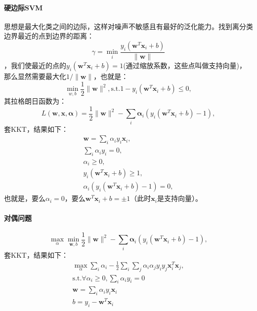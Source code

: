\paragraph{硬边际SVM} 思想是最大化类之间的边际，这样对噪声不敏感且有最好的泛化能力。找到离分类边界最近的点到边界的距离：
$$\gamma = \min_i \frac{y_i(\bm w^T\bm x_i + b)}{\|\bm w\|}$$，我们使最近的点的$y_i(\bm w^T\bm x_i + b) = 1$(通过缩放系数，这些点叫做支持向量)，那么显然需要最大化$1/\|\bm w\|$，也就是：
$$\min_{w,b} \frac{1}{2}\|\bm w\|^2, \text{s.t.} 1 - y_i(\bm w^T\bm x_i + b) \le 0,$$
其拉格朗日函数为：
$$L(\bm w, \bm x, \bm \alpha) = \frac{1}{2}\|\bm w\|^2 - \sum_i \bm \alpha_i(y_i(\bm w^T\bm x_i + b) - 1),$$套KKT，结果如下：
$$\begin{array}{l}
\bm w = \sum_i \alpha_iy_i\bm x_i, \\
\sum_i \alpha_iy_i = 0, \\
\alpha_i \ge 0, \\
y_i(\bm w^T\bm x_i + b) \ge 1, \\
\alpha_i(y_i(\bm w^T\bm x_i + b) - 1) = 0,
\end{array}$$
也就是，要么$\alpha_i = 0$，要么$\bm w^T\bm x_i + b = \pm 1$（此时$\bm x_i$是支持向量）。
\paragraph{对偶问题}
$$\max_\alpha\min_{\bm w, b} \frac{1}{2}\|\bm w\|^2 - \sum_i \bm \alpha_i(y_i(\bm w^T\bm x_i + b) - 1),$$
套KKT，结果如下：
$$
\begin{array}{l}
\max_\alpha \sum_i \alpha_i - \frac{1}{2}\sum_i\sum_j \alpha_i\alpha_jy_iy_j\bm{x}_i^T\bm{x}_j, \\
\text{s.t.} \forall \alpha_i \ge 0, \sum_i \alpha_iy_i = 0 \\
\bm w = \sum_i \alpha_iy_i\bm x_i \\
b = y_i - \bm w^T \bm x_i
\end{array}
$$

